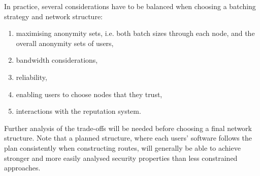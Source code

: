 \documentclass{llncs}
\begin{document}
In practice, several considerations have to be balanced when choosing
a batching strategy and network structure:

\begin{enumerate}
\item maximising anonymity sets, i.e. both batch sizes through each
      node, and the overall anonymity sets of users,
\item bandwidth considerations,
\item reliability,
\item enabling users to choose nodes that they trust,
\item interactions with the reputation system.
\end{enumerate}

Further analysis of the trade-offs will be needed before choosing a
final network structure. Note that a planned structure, where each
users' software follows the plan consistently when constructing
routes, will generally be able to achieve stronger and more easily
analysed security properties than less constrained approaches.


\end{document}

